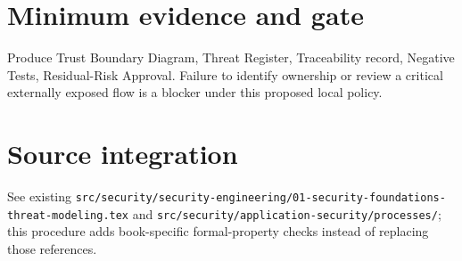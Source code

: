 \documentclass[10pt,letterpaper]{article}
\begin{document}
\section{Minimum evidence and gate}
Produce Trust Boundary Diagram, Threat Register, Traceability record, Negative Tests, Residual-Risk Approval. Failure to identify ownership or review a critical externally exposed flow is a blocker under this proposed local policy.
\section{Source integration}
See existing \nolinkurl{src/security/security-engineering/01-security-foundations-threat-modeling.tex} and \nolinkurl{src/security/application-security/processes/}; this procedure adds book-specific formal-property checks instead of replacing those references.
\end{document}
